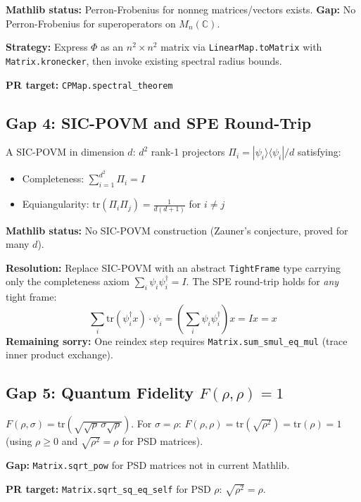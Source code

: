 \documentclass[12pt, letterpaper]{article}
\theoremstyle{plain}
\theoremstyle{definition}
\theoremstyle{remark}
\begin{document}
\textbf{Mathlib status:} Perron-Frobenius for nonneg matrices/vectors exists.
\textbf{Gap:} No Perron-Frobenius for superoperators on $M_n(\mathbb{C})$.

\textbf{Strategy:} Express $\Phi$ as an $n^2 \times n^2$ matrix via
\texttt{LinearMap.toMatrix} with \texttt{Matrix.kronecker}, then invoke
existing spectral radius bounds.

\textbf{PR target:} \texttt{CPMap.spectral\_theorem}

\subsection{Gap 4: SIC-POVM and SPE Round-Trip}

A SIC-POVM in dimension $d$: $d^2$ rank-1 projectors $\Pi_i = |\psi_i\rangle\langle\psi_i|/d$ satisfying:
\begin{itemize}[nosep]
  \item Completeness: $\sum_{i=1}^{d^2} \Pi_i = I$
  \item Equiangularity: $\mathrm{tr}(\Pi_i \Pi_j) = \frac{1}{d(d+1)}$ for $i \neq j$
\end{itemize}

\textbf{Mathlib status:} No SIC-POVM construction (Zauner's conjecture, proved for many $d$).

\textbf{Resolution:} Replace SIC-POVM with an abstract \texttt{TightFrame} type
carrying only the completeness axiom $\sum_i \psi_i\psi_i^\dagger = I$.
The SPE round-trip holds for \emph{any} tight frame:
\[
  \sum_i \mathrm{tr}(\psi_i^\dagger x) \cdot \psi_i = \left(\sum_i \psi_i\psi_i^\dagger\right) x = Ix = x
\]
\textbf{Remaining sorry:} One reindex step requires
\texttt{Matrix.sum\_smul\_eq\_mul} (trace inner product exchange).

\subsection{Gap 5: Quantum Fidelity $F(\rho,\rho) = 1$}

$F(\rho,\sigma) = \mathrm{tr}\!\left(\sqrt{\sqrt{\rho}\,\sigma\sqrt{\rho}}\right)$.
For $\sigma = \rho$: $F(\rho,\rho) = \mathrm{tr}(\sqrt{\rho^2}) = \mathrm{tr}(\rho) = 1$
(using $\rho \geq 0$ and $\sqrt{\rho^2} = \rho$ for PSD matrices).

\textbf{Gap:} \texttt{Matrix.sqrt\_pow} for PSD matrices not in current Mathlib.

\textbf{PR target:} \texttt{Matrix.sqrt\_sq\_eq\_self} for PSD $\rho$:
$\sqrt{\rho^2} = \rho$.
\end{document}
